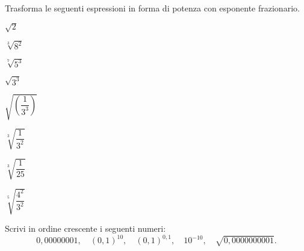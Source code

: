 \begin{esercizio}[\Ast]
 \label{ese:2.18}
Trasforma le seguenti espressioni in forma di potenza con esponente 
frazionario.
 \begin{multicols}{3}
 \begin{enumeratea}
 \item $\sqrt 2$
 \item $\sqrt[3]{8^2}$
 \item $\sqrt[7]{5^3}$
 \item $\sqrt{3^3}$
 \item $\sqrt{\left(\dfrac 1{3^3}\right)}$
 \item $\sqrt[3]{\dfrac 1{3^2}}$
 \item $\sqrt[3]{\dfrac 1{25}}$
 \item $\sqrt[5]{\dfrac{4^2}{3^2}}$
 \end{enumeratea}
 \end{multicols}
\end{esercizio}


% 


\begin{esercizio}
 \label{ese:2.20}
Scrivi in ordine crescente i seguenti numeri:
 \[0,00000001,\quad (0,1)^{10},\quad (0,1)^{0,1},\quad 10^{-10},
 \quad \sqrt{0,0000000001}.\]
\end{esercizio}

